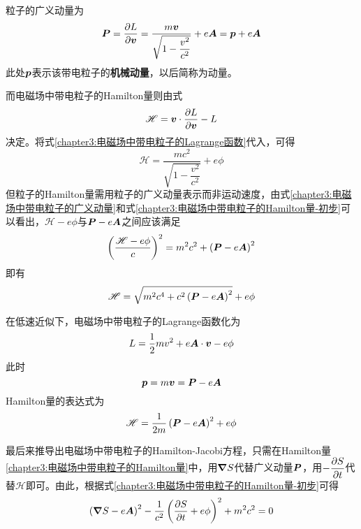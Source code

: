 粒子的广义动量为
\begin{equation}
	\boldsymbol{P} = \frac{\partial L}{\partial \boldsymbol{v}} = \frac{m\boldsymbol{v}}{\sqrt{1-\dfrac{v^2}{c^2}}} + e\boldsymbol{A} = \boldsymbol{p}+e\boldsymbol{A}
	\label{chapter3:电磁场中带电粒子的广义动量}
\end{equation}
此处$\boldsymbol{p}$表示该带电粒子的{\bf 机械动量}，以后简称为动量。

而电磁场中带电粒子的Hamilton量则由式
\begin{equation*}
	\mathscr{H} = \boldsymbol{v}\cdot \frac{\partial L}{\partial \boldsymbol{v}} - L
\end{equation*}
决定。将式\eqref{chapter3:电磁场中带电粒子的Lagrange函数}代入，可得
\begin{equation}
	\mathscr{H} = \frac{mc^2}{\sqrt{1-\dfrac{v^2}{c^2}}}+e\phi
	\label{chapter3:电磁场中带电粒子的Hamilton量-用速度表示的Hamilton量}
\end{equation}
但粒子的Hamilton量需用粒子的广义动量表示而非运动速度，由式\eqref{chapter3:电磁场中带电粒子的广义动量}和式\eqref{chapter3:电磁场中带电粒子的Hamilton量-初步}可以看出，$\mathscr{H}-e\phi$与$\boldsymbol{P}-e\boldsymbol{A}$之间应该满足
\begin{equation}
	\left(\frac{\mathscr{H}-e\phi}{c}\right)^2 = m^2c^2+\left(\boldsymbol{P}-e\boldsymbol{A}\right)^2
	\label{chapter3:电磁场中带电粒子的Hamilton量-初步}
\end{equation}
即有
\begin{equation}
	\mathscr{H} = \sqrt{m^2c^4+c^2\left(\boldsymbol{P}-e\boldsymbol{A}\right)^2}+e\phi
	\label{chapter3:电磁场中带电粒子的Hamilton量}
\end{equation}

在低速近似下，电磁场中带电粒子的Lagrange函数化为
\begin{equation}
	L = \frac12mv^2+e\boldsymbol{A}\cdot \boldsymbol{v}-e\phi
	\label{chapter3:低速近似下，电磁场中带电粒子的Lagrange函数}
\end{equation}
此时
\begin{equation*}
	\boldsymbol{p} = m\boldsymbol{v} = \boldsymbol{P}-e\boldsymbol{A}
\end{equation*}
Hamilton量的表达式为
\begin{equation}
	\mathscr{H} = \frac{1}{2m}\left(\boldsymbol{P}-e\boldsymbol{A}\right)^2 + e\phi
	\label{chapter3:低速近似下，电磁场中带电粒子的Hamilton量}
\end{equation}

最后来推导出电磁场中带电粒子的Hamilton-Jacobi方程，只需在Hamilton量\eqref{chapter3:电磁场中带电粒子的Hamilton量}中，用$\boldsymbol{\nabla} S$代替广义动量$\boldsymbol{P}$，用$-\dfrac{\partial S}{\partial t}$代替$\mathscr{H}$即可。由此，根据式\eqref{chapter3:电磁场中带电粒子的Hamilton量-初步}可得
\begin{equation}
	\left(\boldsymbol{\nabla} S-e\boldsymbol{A}\right)^2-\frac{1}{c^2}\left(\frac{\partial S}{\partial t} + e\phi\right)^2 + m^2c^2 = 0
	\label{chapter3:电磁场中带电粒子的Hamilton-Jacobi方程}
\end{equation}

